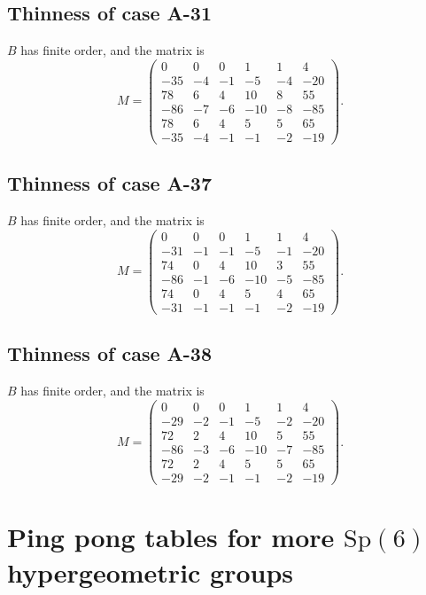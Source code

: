 \documentclass[11pt,a4paper]{amsart}
\theoremstyle{definition}
\theoremstyle{definition}
\numberwithin{equation}{section}
\newcommand{\Sp}{\mathrm{Sp}}
\begin{document}
\subsection{Thinness of case A-31}
$B$ has finite order, and the matrix is
$$M=\left(\begin{array}{rrrrrr}
0 & 0 & 0 & 1 & 1 & 4 \\
-35 & -4 & -1 & -5 & -4 & -20 \\
78 & 6 & 4 & 10 & 8 & 55 \\
-86 & -7 & -6 & -10 & -8 & -85 \\
78 & 6 & 4 & 5 & 5 & 65 \\
-35 & -4 & -1 & -1 & -2 & -19
\end{array}\right).$$

\subsection{Thinness of case A-37}
$B$ has finite order, and the matrix is
$$
M=\left(\begin{array}{rrrrrr}
0 & 0 & 0 & 1 & 1 & 4 \\
-31 & -1 & -1 & -5 & -1 & -20 \\
74 & 0 & 4 & 10 & 3 & 55 \\
-86 & -1 & -6 & -10 & -5 & -85 \\
74 & 0 & 4 & 5 & 4 & 65 \\
-31 & -1 & -1 & -1 & -2 & -19
\end{array}\right).
$$

\subsection{Thinness of case A-38} 
$B$ has finite order, and the matrix is
$$ M=\left(\begin{array}{rrrrrr}
0 & 0 & 0 & 1 & 1 & 4 \\
-29 & -2 & -1 & -5 & -2 & -20 \\
72 & 2 & 4 & 10 & 5 & 55 \\
-86 & -3 & -6 & -10 & -7 & -85 \\
72 & 2 & 4 & 5 & 5 & 65 \\
-29 & -2 & -1 & -1 & -2 & -19
\end{array}\right).$$



\section{Ping pong tables for more \texorpdfstring{$\Sp(6)$}{Sp(6)} hypergeometric groups}\label{se:morethin}
\end{document}
